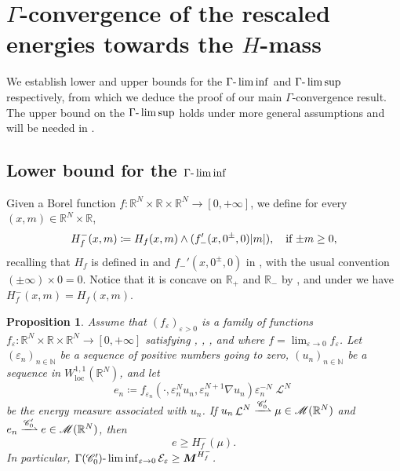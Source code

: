 \documentclass[10pt]{amsart}
\theoremstyle{plain}
\newtheorem{proposition}[theorem]{Proposition}
\theoremstyle{definition}
\newcommand{\N}{\mathbb{N}}
\newcommand{\R}{\mathbb{R}}
\newcommand{\Cspace}{\mathscr{C}}
\newcommand{\Mspace}{\mathscr{M}}
\newcommand{\ener}{\mathcal{E}}
\newcommand{\mass}{\boldsymbol{M}}
\newcommand{\loc}{\mathrm{loc}}
\newcommand{\eps}{\varepsilon}
\DeclarePairedDelimiter{\abs}{\lvert}{\rvert}
\DeclareMathOperator{\lbm}{\mathcal{L}}
\newcommand{\mweakto}{\xrightharpoonup{\Cspace_0'}}
\begin{document}
\section{\texorpdfstring{$\Gamma$}{Γ}-convergence of the rescaled energies towards the \texorpdfstring{\(H\)-mass}{H-mass}}\label{sectionGammaConvergence}

We establish lower and upper bounds for the $\Gamma\textup{-}\liminf$ and $\Gamma\textup{-}\limsup$ respectively, from which we deduce the proof of our main $\Gamma$-convergence result. The upper bound on the $\Gamma\textup{-}\limsup$ holds under more general assumptions and will be needed in .

\subsection{Lower bound for the \texorpdfstring{\(\Gamma\textup{-}\liminf\)}{Γ-liminf}}

Given a Borel function $f : \R^N \times \R \times \R^N \to [0,+\infty]$, we define for every $(x,m)\in \R^N\times \R$,
\begin{equation}
\label{definitionLowerCost}
H_f^-(x,m) \coloneqq H_f(x,m) \wedge (f'_-(x,0^\pm,0) \abs{m}), \quad\text{if $\pm m\geq 0$},
\end{equation}
recalling that \(H_f\) is defined in  and \(f_{-}'(x,0^\pm,0)\) in , with the usual convention $(\pm\infty) \times 0 = 0$. Notice that it is concave on $\R_+$ and $\R_-$ by , and under  we have \(H_f^-(x,m) =H_f(x,m)\).

\begin{proposition}\label{lowerBound}
Assume that $(f_\eps)_{\eps > 0}$ is a family of functions \(f_\eps:\R^N\times\R\times\R^N\to[0,+\infty]\) satisfying , , ,  and  where $f=\lim_{\eps\to 0} f_\eps$. Let \((\eps_n)_{n\in\N}\) be a sequence of positive numbers going to zero, \((u_n)_{n\in\N}\) be a sequence in \(W^{1,1}_\loc(\R^N)\), and let
\[
e_n \coloneqq f_{\eps_n}(\cdot,\eps_n^N u_{n},\eps_n^{N+1} \nabla u_n)\eps_n^{-N} \lbm^N
\]
be the energy measure associated with $u_n$. If \(u_n\lbm^N\mweakto \mu\in\Mspace(\R^N)\) and $e_n \mweakto e \in \Mspace(\R^N)$, then
\begin{equation}
\label{mainLowerBound}
e \geq H_f^-(\mu).
\end{equation}
In particular, \(\Gamma(\Cspace_0')\textup{-}\liminf_{\eps \to 0} \ener_\eps \geq \mass^{H_f^-}\).
\end{proposition}
\end{document}
